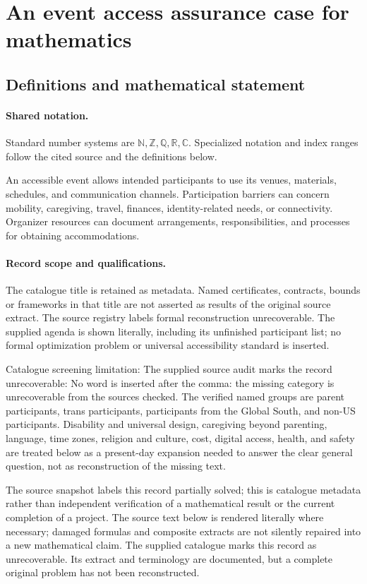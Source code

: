 \documentclass[11pt]{article}
\begin{document}
\section{An event access assurance case for mathematics}\label{statement}

\subsection{Definitions and mathematical statement}

\paragraph{Shared notation.}Standard number systems are $\mathbb N,\mathbb Z,\mathbb Q,\mathbb R,\mathbb C$. Specialized notation and index ranges follow the cited source and the definitions below.


An accessible event allows intended participants to use its venues, materials, schedules, and communication channels. Participation barriers can concern mobility, caregiving, travel, finances, identity-related needs, or connectivity. Organizer resources can document arrangements, responsibilities, and processes for obtaining accommodations.
\paragraph{Record scope and qualifications.}
The catalogue title is retained as metadata. Named certificates, contracts, bounds or frameworks in that title are not asserted as results of the original source extract.
The source registry labels formal reconstruction unrecoverable. The supplied agenda is shown literally, including its unfinished participant list; no formal optimization problem or universal accessibility standard is inserted.

Catalogue screening limitation: The supplied source audit marks the record unrecoverable: No word is inserted after the comma: the missing category is unrecoverable from the sources checked. The verified named groups are parent participants, trans participants, participants from the Global South, and non-US participants. Disability and universal design, caregiving beyond parenting, language, time zones, religion and culture, cost, digital access, health, and safety are treated below as a present-day expansion needed to answer the clear general question, not as reconstruction of the missing text.

The source snapshot labels this record partially solved; this is catalogue metadata rather than independent verification of a mathematical result or the current completion of a project.
The source text below is rendered literally where necessary; damaged formulas and composite extracts are not silently repaired into a new mathematical claim.
The supplied catalogue marks this record as unrecoverable. Its extract and terminology are documented, but a complete original problem has not been reconstructed.
\end{document}
